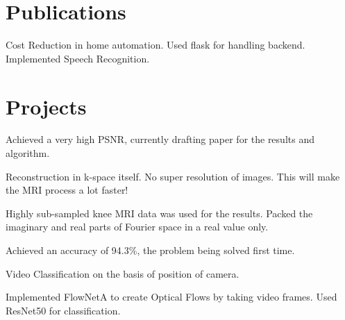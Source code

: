 \documentclass[a4paper]{deedy-resume-openfont}
\begin{document}
\begin{minipage}[t]{0.66\textwidth}
\section{Publications}

Cost Reduction in home automation. Used flask for handling backend. Implemented Speech Recognition.  


\section{Projects}

\begin{tightemize}
\item Achieved a very high PSNR, currently drafting paper for the results and algorithm.
\item Reconstruction in k-space itself. No super resolution of images. This will make the MRI process a lot faster!
\item Highly sub-sampled knee MRI data was used for the results. Packed the imaginary and real parts of Fourier space in a real value only.
\end{tightemize}
\sectionsep

\begin{tightemize}
\item Achieved an accuracy of 94.3\%, the problem being solved first time.
\item Video Classification on the basis of position of camera. \item Implemented FlowNetA to create Optical Flows by taking video frames. Used ResNet50 for classification.
\end{tightemize}



\end{minipage}
\end{document}

